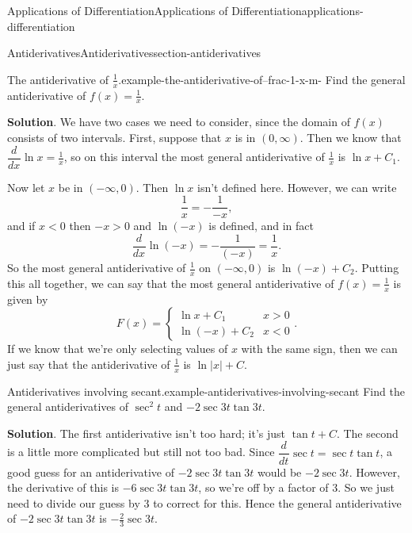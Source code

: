 \documentclass[oneside,10pt,]{book}
\numberwithin{equation}{section}
\newcommand{\dv}[3][]{\dfrac{d^{#1} #2}{d #3^{#1}}}
\begin{document}
\begin{chapterptx}{Applications of Differentiation}{}{Applications of Differentiation}{}{}{applications-differentiation}
\begin{sectionptx}{Antiderivatives}{}{Antiderivatives}{}{}{section-antiderivatives}
\begin{example}{The antiderivative of \(\frac{1}{x}\).}{example-the-antiderivative-of--frac-1-x-m-}
\hypertarget{p-387}{}%
Find the general antiderivative of \(f(x) = \frac{1}{x}\).%
\par\smallskip%
\noindent\textbf{Solution}.\hypertarget{solution-86}{}\quad%
\hypertarget{p-388}{}%
We have two cases we need to consider, since the domain of \(f(x)\) consists of two intervals. First, suppose that \(x\) is in \((0,\infty)\). Then we know that \(\dv{}{x}\ln x = \frac{1}{x}\), so on this interval the most general antiderivative of \(\frac{1}{x}\) is \(\ln x + C_{1}\).%
\par
\hypertarget{p-389}{}%
Now let \(x\) be in \((-\infty,0)\). Then \(\ln x\) isn't defined here. However, we can write%
\begin{equation*}
\frac{1}{x} = -\frac{1}{-x},
\end{equation*}
and if \(x < 0\) then \(-x > 0\) and \(\ln(-x)\) is defined, and in fact%
\begin{equation*}
\dv{}{x}\ln(-x) = -\frac{1}{(-x)} = \frac{1}{x}.
\end{equation*}
So the most general antiderivative of \(\frac{1}{x}\) on \((-\infty,0)\) is \(\ln(-x) + C_{2}\). Putting this all together, we can say that the most general antiderivative of \(f(x) = \frac{1}{x}\) is given by%
\begin{equation*}
F(x) = \begin{cases} \ln x + C_{1} & x > 0 \\ \ln(-x) + C_{2} & x < 0\end{cases}.
\end{equation*}
If we know that we're only selecting values of \(x\) with the same sign, then we can just say that the antiderivative of \(\frac{1}{x}\) is \(\ln|x| + C\).%
\end{example}
\begin{example}{Antiderivatives involving secant.}{example-antiderivatives-involving-secant}%
\hypertarget{p-390}{}%
Find the general antiderivatives of \(\sec^{2}t\) and \(-2\sec3t\tan3t\).%
\par\smallskip%
\noindent\textbf{Solution}.\hypertarget{solution-87}{}\quad%
\hypertarget{p-391}{}%
The first antiderivative isn't too hard; it's just \(\tan t+C\). The second is a little more complicated but still not too bad. Since \(\dv{}{t}\sec t = \sec t\tan t\), a good guess for an antiderivative of \(-2\sec3t\tan3t\) would be \(-2\sec3t.\) However, the derivative of this is \(-6\sec3t\tan3t\), so we're off by a factor of \(3\). So we just need to divide our guess by \(3\) to correct for this. Hence the general antiderivative of \(-2\sec3t\tan3t\) is \(-\frac{2}{3}\sec3t\).%

\end{example}
\end{sectionptx}
\end{chapterptx}
\end{document}
